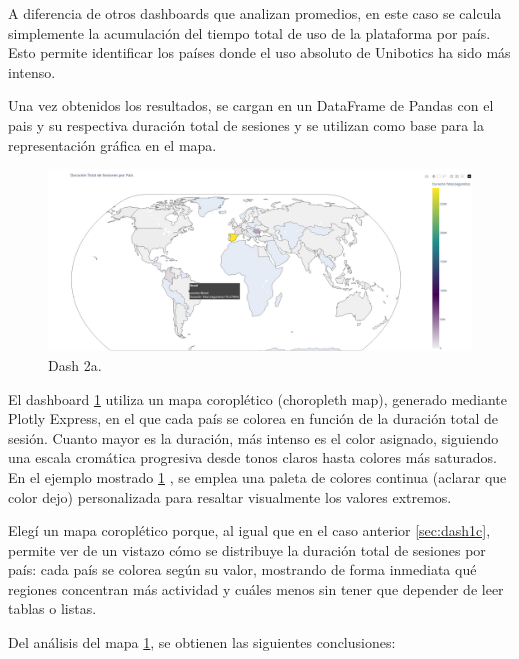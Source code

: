 \documentclass[a4paper, 12pt]{book}
\begin{document}
A diferencia de otros dashboards que analizan promedios, en este caso se calcula simplemente la acumulación del tiempo total de uso de la plataforma por país. Esto permite identificar los países donde el uso absoluto de Unibotics ha sido más intenso.

Una vez obtenidos los resultados, se cargan en un DataFrame de Pandas con el pais y su respectiva duración total de sesiones y se utilizan como base para la representación gráfica en el mapa.

\begin{figure}
  \centering
  \includegraphics[width=1.1\textwidth]{img/2a.png}
  \caption{Dash 2a.}\label{fig:2a}
\end{figure}


El dashboard \ref{fig:2a} utiliza un mapa coroplético (choropleth map), generado mediante Plotly Express, en el que cada país se colorea en función de la duración total de sesión. Cuanto mayor es la duración, más intenso es el color asignado, siguiendo una escala cromática progresiva desde tonos claros hasta colores más saturados. En el ejemplo mostrado \ref{fig:2a} , se emplea una paleta de colores continua (aclarar que color dejo) personalizada para resaltar visualmente los valores extremos.

Elegí un mapa coroplético porque, al igual que en el caso anterior \ref{sec:dash1c}, permite ver de un vistazo cómo se distribuye la duración total de sesiones por país: cada país se colorea según su valor, mostrando de forma inmediata qué regiones concentran más actividad y cuáles menos sin tener que depender de leer tablas o listas.

Del análisis del mapa \ref{fig:2a}, se obtienen las siguientes conclusiones:
\end{document}
